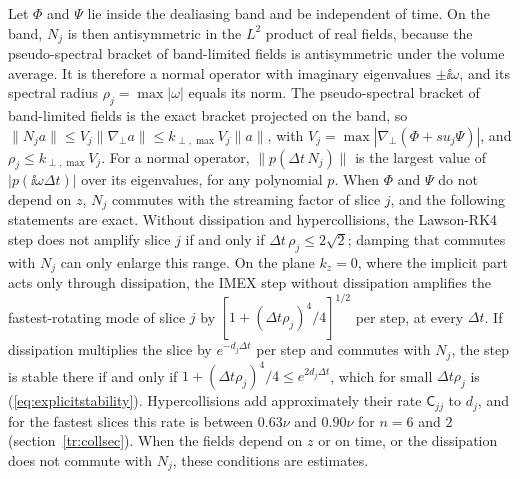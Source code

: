 Let $\Phi$ and $\Psi$ lie inside the dealiasing band and be independent of time. On the band, $N_j$ is then antisymmetric in the $L^2$ product of real fields, because the pseudo-spectral bracket of band-limited fields is antisymmetric under the volume average. It is therefore a normal operator with imaginary eigenvalues $\pm\ii\omega$, and its spectral radius $\rho_j=\max|\omega|$ equals its norm. The pseudo-spectral bracket of band-limited fields is the exact bracket projected on the band, so $\|N_ja\|\le V_j\|\nabla_\perp a\|\le k_{\perp,\max}V_j\|a\|$, with $V_j=\max|\nabla_\perp(\Phi+su_j\Psi)|$, and $\rho_j\le k_{\perp,\max}V_j$. For a normal operator, $\|p(\Delta t\,N_j)\|$ is the largest value of $|p(\ii\omega\Delta t)|$ over its eigenvalues, for any polynomial $p$. When $\Phi$ and $\Psi$ do not depend on $z$, $N_j$ commutes with the streaming factor of slice $j$, and the following statements are exact. Without dissipation and hypercollisions, the Lawson-RK4 step does not amplify slice $j$ if and only if $\Delta t\,\rho_j\le2\sqrt2$; damping that commutes with $N_j$ can only enlarge this range. On the plane $k_z=0$, where the implicit part acts only through dissipation, the IMEX step without dissipation amplifies the fastest-rotating mode of slice $j$ by $[1+(\Delta t\rho_j)^4/4]^{1/2}$ per step, at every $\Delta t$. If dissipation multiplies the slice by $e^{-d_j\Delta t}$ per step and commutes with $N_j$, the step is stable there if and only if $1+(\Delta t\rho_j)^4/4\le e^{2d_j\Delta t}$, which for small $\Delta t\rho_j$ is (\ref{eq:explicitstability}). Hypercollisions add approximately their rate $\mathsf C_{jj}$ to $d_j$, and for the fastest slices this rate is between $0.63\nu$ and $0.90\nu$ for $n=6$ and $2$ (section~\ref{tr:collsec}). When the fields depend on $z$ or on time, or the dissipation does not commute with $N_j$, these conditions are estimates.

